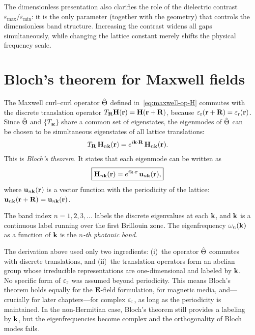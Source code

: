The dimensionless presentation also clarifies the role of the dielectric
contrast $\varepsilon_{\max}/\varepsilon_{\min}$: it is the only
parameter (together with the geometry) that controls the dimensionless
band structure. Increasing the contrast widens all gaps simultaneously,
while changing the lattice constant merely shifts the physical frequency
scale.


\section{Bloch's theorem for Maxwell fields}
\label{sec:bloch-theorem}

The Maxwell curl--curl operator $\hat{\Theta}$ defined in~\eqref{eq:maxwell-op-H}
commutes with the discrete translation operator
$T_{\mathbf{R}}\mathbf{H}(\mathbf{r}) = \mathbf{H}(\mathbf{r} + \mathbf{R})$, because
$\varepsilon_{\mathrm{r}}(\mathbf{r} + \mathbf{R}) = \varepsilon_{\mathrm{r}}(\mathbf{r})$. Since $\hat{\Theta}$ and
$\{T_{\mathbf{R}}\}$ share a common set of eigenstates, the eigenmodes of
$\hat{\Theta}$ can be chosen to be simultaneous eigenstates of all lattice
translations:
\begin{equation}
 T_{\mathbf{R}}\,\mathbf{H}_{n\mathbf{k}}(\mathbf{r})
 = e^{i\mathbf{k}\cdot\mathbf{R}}\,\mathbf{H}_{n\mathbf{k}}(\mathbf{r}).
 \label{eq:bloch-condition}
\end{equation}
This is \emph{Bloch's theorem}. It states that each eigenmode can be
written as
\begin{equation}
 \boxed{
 \mathbf{H}_{n\mathbf{k}}(\mathbf{r}) = e^{i\mathbf{k}\cdot\mathbf{r}}\,\mathbf{u}_{n\mathbf{k}}(\mathbf{r}),
 }
 \label{eq:bloch-mode}
\end{equation}
where $\mathbf{u}_{n\mathbf{k}}(\mathbf{r})$ is a vector function with the periodicity
of the lattice: $\mathbf{u}_{n\mathbf{k}}(\mathbf{r} + \mathbf{R}) = \mathbf{u}_{n\mathbf{k}}(\mathbf{r})$.

The band index $n = 1, 2, 3, \ldots$ labels the discrete eigenvalues at each
$\mathbf{k}$, and $\mathbf{k}$ is a continuous label running over the first Brillouin zone.
The eigenfrequency $\omega_n(\mathbf{k})$ as a function of $\mathbf{k}$ is the
\emph{$n$-th photonic band}.

\begin{booknote}
The derivation above used only two ingredients: (i)~the operator $\hat{\Theta}$
commutes with discrete translations, and (ii)~the translation operators
form an abelian group whose irreducible representations are one-dimensional
and labeled by $\mathbf{k}$. No specific form of $\varepsilon_{\mathrm{r}}$ was assumed beyond
periodicity. This means Bloch's theorem holds equally for the $\mathbf{E}$-field
formulation, for magnetic media, and---crucially for later chapters---for
complex $\varepsilon_{\mathrm{r}}$, as long as the periodicity is maintained. In the
non-Hermitian case, Bloch's theorem still provides a labeling by $\mathbf{k}$,
but the eigenfrequencies become complex and the orthogonality of Bloch
modes fails.
\end{booknote}


